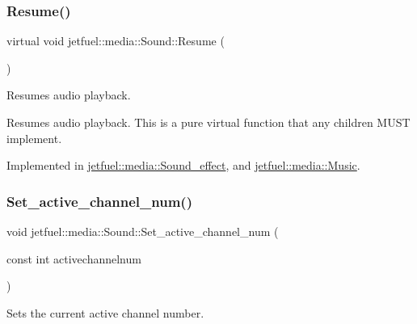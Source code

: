 \mbox{\label{classjetfuel_1_1media_1_1Sound_af781fccd8ebb1305e97dc8f6b7c828dc}} 
\subsubsection{\texorpdfstring{Resume()}{Resume()}}
{\footnotesize\ttfamily virtual void jetfuel\+::media\+::\+Sound\+::\+Resume (\begin{DoxyParamCaption}{ }\end{DoxyParamCaption})\hspace{0.3cm}{\ttfamily [pure virtual]}}



Resumes audio playback. 

Resumes audio playback. This is a pure virtual function that any children M\+U\+ST implement. 

Implemented in \hyperlink{classjetfuel_1_1media_1_1Sound__effect_a8849f5324b2c049c63ed3a0bbbd88467}{jetfuel\+::media\+::\+Sound\+\_\+effect}, and \hyperlink{classjetfuel_1_1media_1_1Music_a0c8e12634e29cfe37138349776b6d9a8}{jetfuel\+::media\+::\+Music}.

\mbox{\label{classjetfuel_1_1media_1_1Sound_addaea461cf050aa23501882b2c76b39b}} 
\subsubsection{\texorpdfstring{Set\+\_\+active\+\_\+channel\+\_\+num()}{Set\_active\_channel\_num()}}
{\footnotesize\ttfamily void jetfuel\+::media\+::\+Sound\+::\+Set\+\_\+active\+\_\+channel\+\_\+num (\begin{DoxyParamCaption}\item[{const int}]{activechannelnum }\end{DoxyParamCaption})\hspace{0.3cm}{\ttfamily [inline]}}



Sets the current active channel number. 


